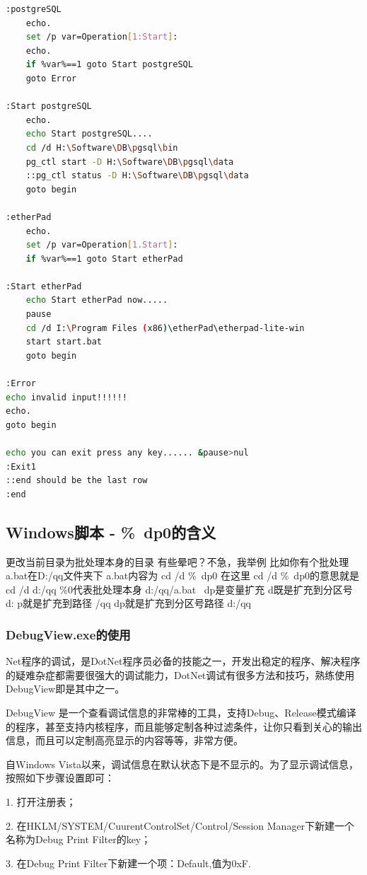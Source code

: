 \documentclass{book}
\begin{document}
\begin{lstlisting}[language=Bash]
:postgreSQL
	echo.
	set /p var=Operation[1:Start]:
	echo.
	if %var%==1 goto Start postgreSQL	
	goto Error	
	
:Start postgreSQL
	echo.
	echo Start postgreSQL....
	cd /d H:\Software\DB\pgsql\bin
	pg_ctl start -D H:\Software\DB\pgsql\data	
	::pg_ctl status -D H:\Software\DB\pgsql\data
	goto begin	

:etherPad
	echo.
	set /p var=Operation[1.Start]:
	if %var%==1 goto Start etherPad

:Start etherPad
	echo Start etherPad now.....
	pause
	cd /d I:\Program Files (x86)\etherPad\etherpad-lite-win
	start start.bat
	goto begin	
	
:Error
echo invalid input!!!!!!
echo.
goto begin

echo you can exit press any key...... &pause>nul
:Exit1 
::end should be the last row
:end
\end{lstlisting}

\subsection{Windows脚本 - \%~dp0的含义}

更改当前目录为批处理本身的目录 
有些晕吧？不急，我举例 
比如你有个批处理a.bat在D:/qq文件夹下  
a.bat内容为 
cd /d \%~dp0 
在这里 
cd /d \%~dp0的意思就是cd /d d:/qq 
\%0代表批处理本身 d:/qq/a.bat 
~dp是变量扩充 
d既是扩充到分区号 d: 
p就是扩充到路径 /qq 
dp就是扩充到分区号路径 d:/qq

\subsubsection{DebugView.exe的使用}

Net程序的调试，是DotNet程序员必备的技能之一，开发出稳定的程序、解决程序的疑难杂症都需要很强大的调试能力，DotNet调试有很多方法和技巧，熟练使用DebugView即是其中之一。

DebugView 是一个查看调试信息的非常棒的工具，支持Debug、Release模式编译的程序，甚至支持内核程序，而且能够定制各种过滤条件，让你只看到关心的输出信息，而且可以定制高亮显示的内容等等，非常方便。 

自Windows Vista以来，调试信息在默认状态下是不显示的。为了显示调试信息，按照如下步骤设置即可：

1. 打开注册表；

 2. 在HKLM/SYSTEM/CuurentControlSet/Control/Session Manager下新建一个名称为Debug Print Filter的key；

 3. 在Debug Print Filter下新建一个项：Default,值为0xF.
\end{document}
